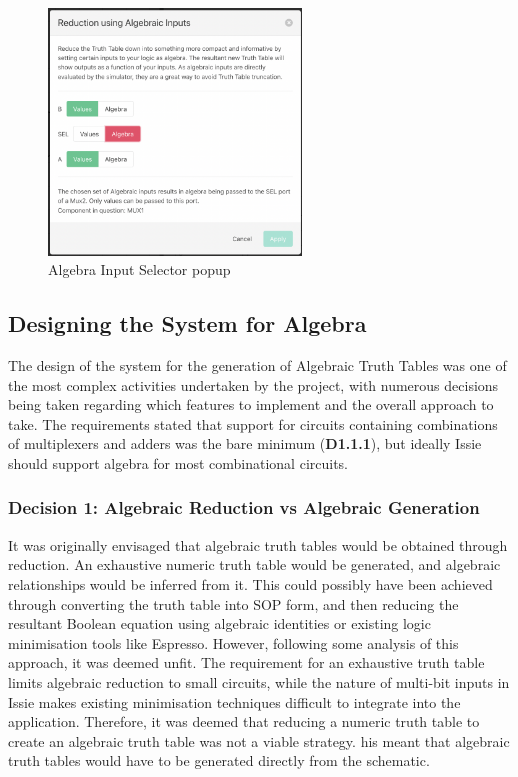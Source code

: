 \begin{figure}
    \centering
    \includegraphics[width=0.6\textwidth]{04.AnalysisDesign/algebrapopup.png}
    \caption{Algebra Input Selector popup}
    \label{fig:algpopup}
\end{figure}

\subsection{Designing the System for Algebra}
The design of the system for the generation of Algebraic Truth Tables was one of the most complex activities undertaken by the project, with numerous decisions being taken regarding which features to implement and the overall approach to take. The requirements stated that support for circuits containing combinations of multiplexers and adders was the bare minimum (\textbf{D1.1.1}), but ideally Issie should support algebra for most combinational circuits.

\subsubsection{Decision 1: Algebraic Reduction vs Algebraic Generation}
It was originally envisaged that algebraic truth tables would be obtained through reduction. An exhaustive numeric truth table would be generated, and algebraic relationships would be inferred from it. This could possibly have been achieved through converting the truth table into SOP form, and then reducing the resultant Boolean equation using algebraic identities or existing logic minimisation tools like Espresso. However, following some analysis of this approach, it was deemed unfit. The requirement for an exhaustive truth table limits algebraic reduction to small circuits, while the nature of multi-bit inputs in Issie makes existing  minimisation techniques difficult to integrate into the application. Therefore, it was deemed that reducing a numeric truth table to create an algebraic truth table was not a viable strategy. his meant that algebraic truth tables would have to be generated directly from the schematic.

